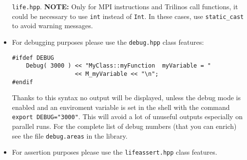 \documentclass[a4paper]{article}
\begin{document}
\begin{itemize}
  \texttt{life.hpp}. \newline \textbf{NOTE:} Only for MPI instructions and
  Trilinos call functions, it could be necessary to use \texttt{int} instead of \texttt{Int}.
  In these cases, use \texttt{static\_cast} to avoid warning messages.
  \item For debugging purposes please use the \texttt{debug.hpp} class features:
\begin{lstlisting}
#ifdef DEBUG
    Debug( 3000 ) << "MyClass::myFunction  myVariable = " 
                  << M_myVariable << "\n"; 
#endif
\end{lstlisting}
  Thanks to this syntax no output will be displayed, unless the debug
  mode is enabled and an enviroment variable is set in the shell with the
  command \texttt{export DEBUG="3000"}. This will avoid a lot of unuseful
  outputs especially on parallel runs. For the complete list of debug numbers
  (that you can enrich) see the file \texttt{debug.areas} in the library.
  \item For assertion purposes please use the \texttt{lifeassert.hpp} class
  features.
\end{itemize}
\end{document}
